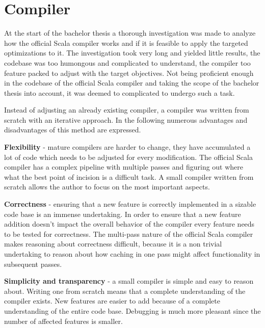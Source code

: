 \documentclass{VUMIFPSbakalaurinis}
\begin{document}

\section{Compiler}
At the start of the bachelor thesis a thorough investigation was made to analyze how the official Scala compiler works \cite{ScalaGithub} and if it is feasible to apply the targeted optimizations to it.
The investigation took very long and yielded little results, the codebase was too humongous and complicated to understand, the compiler too feature packed to adjust with the target objectives.
Not being proficient enough in the codebase of the official Scala compiler and taking the scope of the bachelor thesis into account, it was deemed to complicated to undergo such a task.

Instead of adjusting an already existing compiler, a compiler was written from scratch with an iterative approach.
In the following numerous advantages and disadvantages of this method are expressed.

\textbf{Flexibility} - mature compilers are harder to change, they have accumulated a lot of code which needs to be adjusted for every modification.
The official Scala compiler has a complex pipeline with multiple passes and figuring out where what the best point of incision is a difficult task.
A small compiler written from scratch allows the author to focus on the most important aspects.

\textbf{Correctness} - ensuring that a new feature is correctly implemented in a sizable code base is an immense undertaking.
In order to ensure that a new feature addition doesn't impact the overall behavior of the compiler every feature needs to be tested for correctness.
The multi-pass nature of the official Scala compiler makes reasoning about correctness difficult, because it is a non trivial undertaking to reason about how caching in one pass might affect functionality in subsequent passes.

\textbf{Simplicity and transparency} - a small compiler is simple and easy to reason about.
Writing one from scratch means that a complete understanding of the compiler exists.
New features are easier to add because of a complete understanding of the entire code base.
Debugging is much more pleasant since the number of affected features is smaller.
\end{document}
